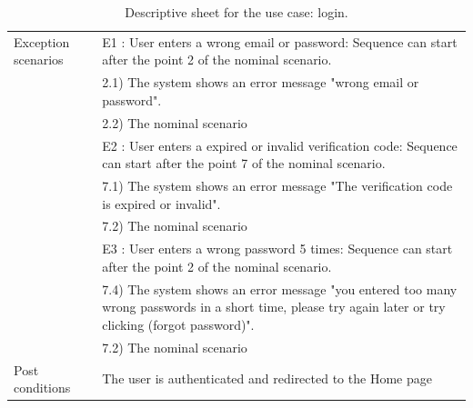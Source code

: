 \documentclass[]{uc2pfecaneva}
\begin{document}
\begin{table}[h]
\begin{tabularx}{\textwidth}{|l|X|}
            Exception scenarios
            & E1 : User enters a wrong email or password: Sequence can start after the point 2 of the nominal scenario.                                                            \\
            & \hspace{4mm}2.1) The system shows an error message "wrong email or password".                                                                                        \\
            & \hspace{4mm}2.2) The nominal scenario                                                                                                                                \\
            & E2 : User enters a expired or invalid verification code: Sequence can start after the point 7 of the nominal scenario.                                               \\
            & \hspace{4mm}7.1) The system shows an error message "The verification code is expired or invalid".                                                                    \\
            & \hspace{4mm}7.2) The nominal scenario                                                                                                                                \\
            & E3 : User enters a wrong password 5 times: Sequence can start after the point 2 of the nominal scenario.                                                             \\
            & \hspace{4mm}7.4) The system shows an error message "you entered too many wrong passwords in a short time, please try again later or try clicking (forgot password)". \\
            & \hspace{4mm}7.2) The nominal scenario                                                                                                                                \\ \hline
            Post conditions
            & The user is authenticated and redirected to the Home page                                                                                                            \\ \hline
        \end{tabularx}
        \caption{Descriptive sheet for the use case: login.}
        \label{table:1}
    \end{table}
    \clearpage
\end{document}
